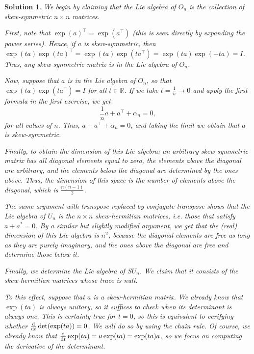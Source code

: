 \documentclass{article}
\theoremstyle{nonumberplain}
\newtheorem{sol}{Solution}
\newcommand{\R}{\mathbb{R}}
\newcommand{\transpose}{\top}
\begin{document}
\begin{sol}
We begin by claiming that the Lie algebra of $O_n$ is the collection of skew-symmetric $n \times n$ matrices.

First, note that $\exp(a)^\transpose = \exp(a^\transpose)$ (this is seen directly by expanding the power series). Hence, if $a$ is skew-symmetric, then $\exp(t a) \exp(t a)^\transpose = \exp(t a) \exp(t a^\transpose) = \exp(t a) \exp(-t a) = I$. Thus, any skew-symmetric matrix is in the Lie algebra of $O_n$.

Now, suppose that $a$ is in the Lie algebra of $O_n$, so that $\exp(t a) \exp(t a^\transpose) = I$ for all $t \in \R$. If we take $t = \frac1n \to 0$ and apply the first formula in the first exercise, we get
\begin{equation}
\frac1n{a + a^\transpose + \alpha_n} = 0,
\end{equation}
for all values of $n$. Thus, $a + a^\transpose + \alpha_n = 0$, and taking the limit we obtain that $a$ is skew-symmetric.

Finally, to obtain the dimension of this Lie algebra: an arbitrary skew-symmetric matrix has all diagonal elements equal to zero, the elements above the diagonal are arbitrary, and the elements below the diagonal are determined by the ones above. Thus, the dimension of this space is the number of elements above the diagonal, which is $\frac{n (n-1)}2$.

\smallskip

The same argument with transpose replaced by conjugate transpose shows that the Lie algebra of $U_n$ is the $n \times n$ skew-hermitian matrices, i.e. those that satisfy $a + a^* = 0$. By a similar but slightly modified argument, we get that the (real) dimension of this Lie algebra is $n^2$, because the diagonal elements are free as long as they are purely imaginary, and the ones above the diagonal are free and determine those below it.

\smallskip

Finally, we determine the Lie algebra of $SU_n$. We claim that it consists of the skew-hermitian matrices whose trace is null.

To this effect, suppose that $a$ is a skew-hermitian matrix. We already know that $\exp(t a)$ is always unitary, so it suffices to check when its determinant is always one. This is certainly true for $t = 0$, so this is equivalent to verifying whether $\diff{}t \det(\exp(ta)) = 0$. We will do so by using the chain rule. Of course, we already know that $\diff{}t \exp(ta) = a \exp(ta) = \exp(ta) a$, so we focus on computing the derivative of the determinant.


\end{sol}
\end{document}
